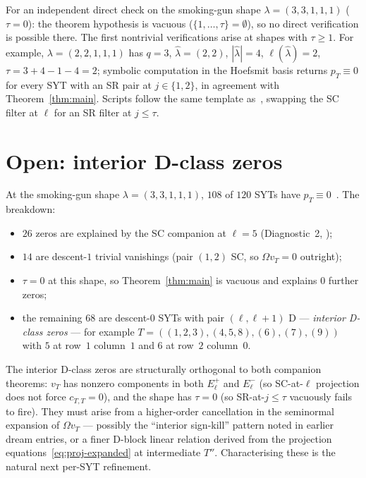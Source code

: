 \documentclass[11pt]{article}
\theoremstyle{definition}
\newcommand{\Om}{\Omega}
\newcommand{\hatl}{\widehat\lambda}
\newcommand{\elh}{\ell(\hatl)}
\newcommand{\Eplus}{E^+}
\newcommand{\Eminus}{E^-}
\newcommand{\pT}{p_T}
\begin{document}
For an independent direct check on the smoking-gun shape $\lambda =
(3, 3, 1, 1, 1)$ ($\tau = 0$): the theorem hypothesis is vacuous
($\{1, \ldots, \tau\} = \emptyset$), so no direct verification is possible
there. The first nontrivial verifications arise at shapes with $\tau \ge 1$.
For example, $\lambda = (2, 2, 1, 1, 1)$ has $q = 3$, $\hatl = (2, 2)$,
$|\hatl| = 4$, $\elh = 2$, $\tau = 3 + 4 - 1 - 4 = 2$; symbolic computation
in the Hoefsmit basis returns $\pT \equiv 0$ for every SYT with an SR pair
at $j \in \{1, 2\}$, in agreement with Theorem~\ref{thm:main}. Scripts
follow the same template as~\cite{leftmostPerSYT}, swapping the SC
filter at $\ell$ for an SR filter at $j \le \tau$.

\section{Open: interior D-class zeros}\label{sec:open}

At the smoking-gun shape $\lambda = (3, 3, 1, 1, 1)$, $108$ of $120$ SYTs
have $\pT \equiv 0$~\cite{survey}. The breakdown:
\begin{itemize}[topsep=0.2em,itemsep=0.1em]
\item $26$ zeros are explained by the SC companion at $\ell = 5$
   (Diagnostic~2, \cite{leftmostPerSYT});
\item $14$ are descent-$1$ trivial vanishings (pair $(1,2)$ SC, so
   $\Om v_T = 0$ outright);
\item $\tau = 0$ at this shape, so Theorem~\ref{thm:main} is vacuous
   and explains $0$ further zeros;
\item the remaining $68$ are descent-$0$ SYTs with pair $(\ell, \ell+1)$
   D — \emph{interior D-class zeros} — for example
   $T = ((1,2,3),(4,5,8),(6),(7),(9))$ with $5$ at row~$1$ column~$1$ and
   $6$ at row~$2$ column~$0$.
\end{itemize}

The interior D-class zeros are structurally orthogonal to both companion
theorems: $v_T$ has nonzero components in both $\Eplus_\ell$ and
$\Eminus_\ell$ (so SC-at-$\ell$ projection does not force $c_{T,T} = 0$),
and the shape has $\tau = 0$ (so SR-at-$j \le \tau$ vacuously fails to
fire). They must arise from a higher-order cancellation in the seminormal
expansion of $\Om v_T$ — possibly the ``interior sign-kill'' pattern noted
in earlier dream entries, or a finer D-block linear relation derived from
the projection equations~\eqref{eq:proj-expanded} at intermediate $T''$.
Characterising these is the natural next per-SYT refinement.
\end{document}
